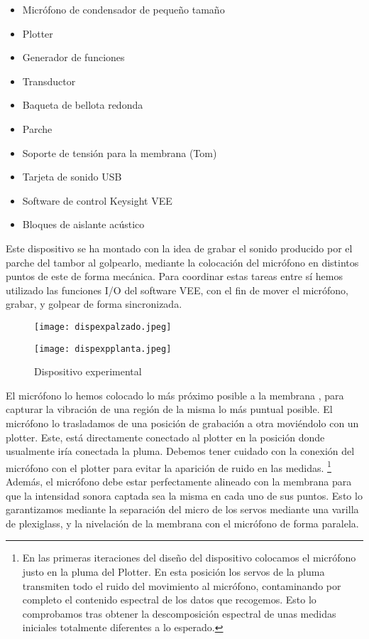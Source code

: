 \documentclass[journal, a4paper,onecolumn]{IEEEtran}
\begin{document}
\begin{itemize}
\item Micrófono de condensador de pequeño tamaño
\item Plotter %
\item Generador de funciones %
\item Transductor
\item Baqueta de bellota redonda
\item Parche %
\item Soporte de tensión para la membrana (Tom)
\item Tarjeta de sonido USB
\item Software de control Keysight VEE 
\item Bloques de aislante acústico
\end{itemize}
\vspace{0.5cm}



Este dispositivo se ha montado con la idea de grabar el sonido producido por el parche del tambor al golpearlo, mediante la colocación del micrófono en distintos puntos de este de forma mecánica. Para coordinar estas tareas entre sí hemos utilizado las funciones I/O del software VEE, con el fin de mover el micrófono, grabar, y golpear de forma sincronizada.
\newline

\begin{figure}[H]
    \centering
    \texttt{[image: dispexpalzado.jpeg]}
    \label{Dispositivoexp}
\end{figure}

\begin{figure}[H]
    \centering
    \texttt{[image: dispexpplanta.jpeg]}
    \caption{Dispositivo experimental}
    \label{Dispositivoexpplanta}
\end{figure}



El micrófono lo hemos colocado lo más próximo posible a la membrana , para capturar la vibración de una región de la misma lo más puntual posible. El micrófono lo trasladamos de una posición de grabación a otra moviéndolo con un plotter. Este, está directamente conectado al plotter en la posición donde usualmente iría conectada la pluma. Debemos tener cuidado con la conexión del micrófono con el plotter para evitar la aparición de ruido en las medidas. \footnote{En las primeras iteraciones del diseño del dispositivo colocamos el micrófono justo en la pluma del Plotter. En esta posición los servos de la pluma transmiten todo el ruido del movimiento al micrófono, contaminando por completo el contenido espectral de los datos que recogemos. Esto lo comprobamos tras obtener la descomposición espectral de unas medidas iniciales totalmente diferentes a lo esperado.} Además, el micrófono debe estar perfectamente alineado con la membrana para que la intensidad sonora captada sea la misma en cada uno de sus puntos.
Esto lo garantizamos mediante la separación del micro de los servos mediante una varilla de plexiglass, y la nivelación de la membrana con el micrófono de forma paralela.\newline 
\end{document}
